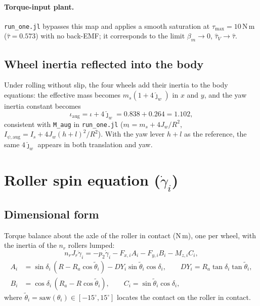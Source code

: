 \documentclass[11pt]{article}
\begin{document}
\paragraph{Torque-input plant.} \texttt{run\_one.jl} bypasses this map and applies
a smooth saturation at $\tau_{\max} = 10$\,N\,m ($\hat\tau = 0.573$) with no
back-EMF; it corresponds to the limit $\beta_m \to 0$, $\hat\tau_V \to \hat\tau$.

\subsection{Wheel inertia reflected into the body}
Under rolling without slip, the four wheels add their inertia to the body
equations: the effective mass becomes $m_s(1 + 4\hat\jmath_w)$ in $x$ and $y$,
and the yaw inertia constant becomes
\begin{equation}
\iota_{\mathrm{aug}} = \iota + 4\hat\jmath_w = 0.838 + 0.264 = 1.102,
\end{equation}
consistent with \texttt{M\_aug} in \texttt{run\_one.jl}
($m_{\tilde{}} = m_s + 4J_w/R^2$, $I_{\psi,\mathrm{aug}} = I_s + 4J_w(h+l)^2/R^2$).
With the yaw lever $h+l$ as the reference, the same $4\hat\jmath_w$ appears in
both translation and yaw.

\section{Roller spin equation ($\dot\gamma_i$)}

\subsection{Dimensional form}
Torque balance about the axle of the roller in contact (N\,m), one per wheel,
with the inertia of the $n_r$ rollers lumped:
\begin{equation}
n_r J_r\ddot\gamma_i = -p_2\dot\gamma_i - F_{x,i}A_i - F_{y,i}B_i - M_{z,i}C_i,
\label{eq:roller}
\end{equation}
\begin{align*}
A_i &= \sin\delta_i\,(R - R_a\cos\tilde\theta_i) - DY_i\sin\tilde\theta_i\cos\delta_i,
\qquad DY_i = R_a\tan\delta_i\tan\tilde\theta_i,\\
B_i &= \cos\delta_i\,(R_a - R\cos\tilde\theta_i), \qquad
C_i = \sin\tilde\theta_i\cos\delta_i,
\end{align*}
where $\tilde\theta_i = \mathrm{saw}(\theta_i)\in[-15^\circ, 15^\circ]$ locates the
contact on the roller in contact.
\end{document}
